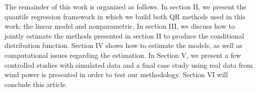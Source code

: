 


The remainder of this work is organized as follows. In section II, we present the quantile regression framework in which we build both QR methods used in this work: the linear model and nonparametric. In section III, we discuss how to jointly estimate the methods presented in section II to produce the conditional distribution function. Section IV shows how to estimate the models, as well as computational issues regarding the estimation. In Section V, we present a few controlled studies with simulated data and a final case study using real data from wind power is presented in order to test our methodology. Section VI will conclude this article.
